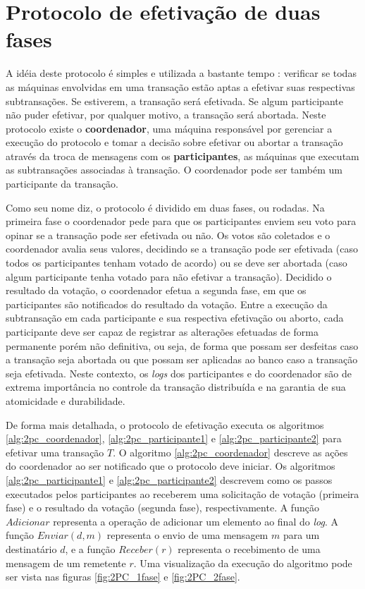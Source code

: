\documentclass[11pt,twoside,a4paper]{book}
\begin{document}
\section{Protocolo de efetivação de duas fases}
\label{sec:2pc}
A idéia deste protocolo é simples e utilizada a bastante tempo \cite{2pc}: verificar se todas as máquinas envolvidas em uma transação estão aptas a efetivar suas respectivas subtransações. Se estiverem, a transação será efetivada. Se algum participante não puder efetivar, por qualquer motivo, a transação será abortada. Neste protocolo existe o \textbf{coordenador}, uma máquina responsável por gerenciar a execução do protocolo e tomar a decisão sobre efetivar ou abortar a transação através da troca de mensagens com os \textbf{participantes}, as máquinas que executam as subtransações associadas à transação. O coordenador pode ser também um participante da transação.

Como seu nome diz, o protocolo é dividido em duas fases, ou rodadas. Na primeira fase o coordenador pede para que os participantes enviem seu voto para opinar se a transação pode ser efetivada ou não. Os votos são coletados e o coordenador avalia seus valores, decidindo se a transação pode ser efetivada (caso todos os participantes tenham votado de acordo) ou se deve ser abortada (caso algum participante tenha votado para não efetivar a transação). Decidido o resultado da votação, o coordenador efetua a segunda fase, em que os participantes são notificados do resultado da votação. Entre a execução da subtransação em cada participante e sua respectiva efetivação ou aborto, cada participante deve ser capaz de registrar as alterações efetuadas de forma permanente porém não definitiva, ou seja, de forma que possam ser desfeitas caso a transação seja abortada ou que possam ser aplicadas ao banco caso a transação seja efetivada. Neste contexto, os \emph{logs} dos participantes e do coordenador são de extrema importância no controle da transação distribuída e na garantia de sua atomicidade e durabilidade.

De forma mais detalhada, o protocolo de efetivação executa os algoritmos \ref{alg:2pc_coordenador}, \ref{alg:2pc_participante1} e \ref{alg:2pc_participante2} para efetivar uma transação $T$. O algoritmo \ref{alg:2pc_coordenador} descreve as ações do coordenador ao ser notificado que o protocolo deve iniciar. Os algoritmos \ref{alg:2pc_participante1} e \ref{alg:2pc_participante2} descrevem como os passos executados pelos participantes ao receberem uma solicitação de votação (primeira fase) e o resultado da votação (segunda fase), respectivamente. A função $Adicionar$ representa a operação de adicionar um elemento ao final do \emph{log}. A função $Enviar(d, m)$ representa o envio de uma mensagem $m$ para um destinatário $d$, e a função $Receber(r)$ representa o recebimento de uma mensagem de um remetente $r$. Uma visualização da execução do algoritmo pode ser vista nas figuras \ref{fig:2PC_1fase} e \ref{fig:2PC_2fase}.
\end{document}
